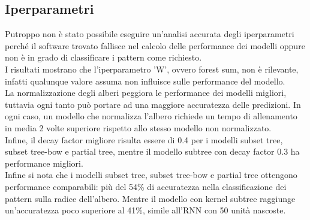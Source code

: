 \subsection{Iperparametri}

Putroppo non è stato possibile eseguire un'analisi accurata degli iperparametri
perché il software trovato fallisce nel calcolo delle performance dei modelli
oppure non è in grado di classificare i pattern come richiesto.\\
I risultati mostrano che l'iperparametro 'W', ovvero forest sum, non è
rilevante, infatti qualunque valore assuma non influisce sulle performance del
modello.\\
La normalizzazione degli alberi peggiora le performance dei modelli migliori,
tuttavia ogni tanto può portare ad una maggiore accuratezza delle predizioni. In
ogni caso, un modello che normalizza l'albero richiede un tempo di allenamento
in media 2 volte superiore rispetto allo stesso modello non normalizzato.\\
Infine, il decay factor migliore risulta essere di 0.4 per i modelli subset
tree, subset tree-bow e partial tree, mentre il modello subtree con decay factor
0.3 ha performance migliori.\\
Infine si nota che i modelli subset tree, subset tree-bow e partial tree
ottengono performance comparabili: più del 54\% di accuratezza nella
classificazione dei pattern sulla radice dell'albero. Mentre il modello con
kernel subtree raggiunge un'accuratezza poco superiore al 41\%, simile all'RNN
con 50 unità nascoste.
